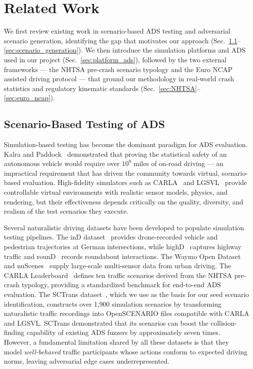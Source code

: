 \section{Related Work}


\iffalse
We first review existing work in scenario-based ADS testing and adversarial scenario generation, identifying the gap that motivates our approach (Sec.~\ref{sec:scenario_based_testing}--\ref{sec:scenario_generation}). We then introduce the simulation platforms and ADS used in our project (Sec.~\ref{sec:platform_ads}), followed by the two external frameworks --- the NHTSA pre-crash scenario typology and the Euro NCAP assisted driving protocol --- that ground our methodology in real-world crash statistics and regulatory kinematic standards (Sec.~\ref{sec:NHTSA}--\ref{sec:euro_ncap}).

\subsection{Scenario-Based Testing of ADS}\label{sec:scenario_based_testing}

Simulation-based testing has become the dominant paradigm for ADS evaluation. Kalra and Paddock~\cite{kalra_driving_2016} demonstrated that proving the statistical safety of an autonomous vehicle would require over $10^9$ miles of on-road driving --- an impractical requirement that has driven the community towards virtual, scenario-based evaluation. High-fidelity simulators such as CARLA~\cite{dosovitskiy_carla_2017} and LGSVL~\cite{rong_lgsvl_2020} provide controllable virtual environments with realistic sensor models, physics, and rendering, but their effectiveness depends critically on the quality, diversity, and realism of the test scenarios they execute.

Several naturalistic driving datasets have been developed to populate simulation testing pipelines. The inD dataset~\cite{bock_ind_2020} provides drone-recorded vehicle and pedestrian trajectories at German intersections, while highD~\cite{krajewski_highd_2018} captures highway traffic and rounD~\cite{krajewski_round_2020} records roundabout interactions. The Waymo Open Dataset~\cite{sun_scalability_2020} and nuScenes~\cite{caesar_nuscenes_2020} supply large-scale multi-sensor data from urban driving. The CARLA Leaderboard~\cite{noauthor_carla_nodate} defines ten traffic scenarios derived from the NHTSA pre-crash typology, providing a standardized benchmark for end-to-end ADS evaluation. The SCTrans dataset~\cite{dai_sctrans_2024}, which we use as the basis for our seed scenario identification, constructs over 1,900 simulation scenarios by transforming naturalistic traffic recordings into OpenSCENARIO files compatible with CARLA and LGSVL. SCTrans demonstrated that its scenarios can boost the collision-finding capability of existing ADS fuzzers by approximately seven times. However, a fundamental limitation shared by all these datasets is that they model \textit{well-behaved} traffic participants whose actions conform to expected driving norms, leaving adversarial edge cases underrepresented.

